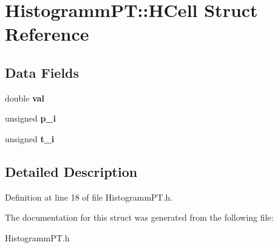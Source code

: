 \section{HistogrammPT::HCell Struct Reference}
\label{structHistogrammPT_1_1HCell}
\subsection*{Data Fields}
\begin{DoxyCompactItemize}
\item 
double {\bfseries val}\label{structHistogrammPT_1_1HCell_a1feacd0780567226c7270ed8ab7fe784}

\item 
unsigned {\bfseries p\_\-i}\label{structHistogrammPT_1_1HCell_adb761ef250b282c8bd8ea3068462f51b}

\item 
unsigned {\bfseries t\_\-i}\label{structHistogrammPT_1_1HCell_af1baacf510aa664689756a994096a369}

\end{DoxyCompactItemize}


\subsection{Detailed Description}


Definition at line 18 of file HistogrammPT.h.

The documentation for this struct was generated from the following file:\begin{DoxyCompactItemize}
\item 
HistogrammPT.h\end{DoxyCompactItemize}
